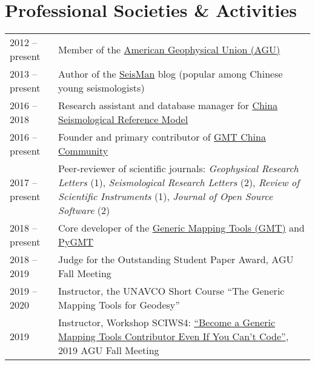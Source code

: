 \section*{Professional Societies \& Activities}

\newcommand{\tabitem}{~~\llap{\textbullet}~~}

\begin{tabular}{p{} p{}}
2012 -- present & Member of the \href{https://sites.agu.org/}{American Geophysical Union (AGU)} \\
2013 -- present & Author of the \href{https://blog.seisman.info}{SeisMan} blog (popular among Chinese young seismologists) \\
2016 -- 2018    & Research assistant and database manager for \href{http://chinageorefmodel.org/}{China Seismological Reference Model} \\
2016 -- present & Founder and primary contributor of \href{http://gmt-china.org/}{GMT China Community} \\
2017 -- present & Peer-reviewer of scientific journals:
                  \textit{Geophysical Research Letters} (1),
                  \textit{Seismological Research Letters} (2),
                  \textit{Review of Scientific Instruments} (1),
                  \textit{Journal of Open Source Software} (2) \\
2018 -- present & Core developer of the \href{https://github.com/GenericMappingTools/gmt}{Generic Mapping Tools (GMT)} and \href{https://github.com/GenericMappingTools/pygmt}{PyGMT} \\
2018 -- 2019 & Judge for the Outstanding Student Paper Award, AGU Fall Meeting \\
2019 -- 2020 & Instructor, the UNAVCO Short Course ``The Generic Mapping Tools for Geodesy'' \\
2019 & Instructor, Workshop SCIWS4: \href{https://www.agu.org/Events/SCIWS4-Generic-Mapping-Tools}{``Become a Generic Mapping Tools Contributor Even If You Can't Code''}, 2019 AGU Fall Meeting \\
\end{tabular}
